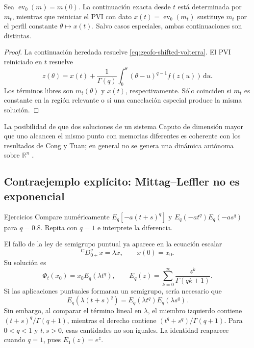 \begin{proposition}
Sea \(\operatorname{ev}_0(m)=m(0)\). La continuación exacta desde \(t\) está
determinada por \(m_t\), mientras que reiniciar el PVI con dato
\(x(t)=\operatorname{ev}_0(m_t)\) sustituye \(m_t\) por el perfil constante
\(\theta\mapsto x(t)\). Salvo casos especiales, ambas continuaciones son
distintas.
\end{proposition}

\begin{proof}
La continuación heredada resuelve \cref{eq:geofo-shifted-volterra}. El PVI
reiniciado en \(t\) resuelve
\begin{equation}
 z(\theta)=x(t)+\frac1{\Gamma(q)}
 \int_0^\theta(\theta-u)^{q-1}f(z(u))\,\mathrm du.
 \label{eq:geofo-reset-volterra}
\end{equation}
Los términos libres son \(m_t(\theta)\) y \(x(t)\), respectivamente. Sólo
coinciden si \(m_t\) es constante en la región relevante o si una cancelación
especial produce la misma solución.
\end{proof}

La posibilidad de que dos soluciones de un sistema Caputo de dimensión mayor
que uno alcancen el mismo punto con memorias diferentes es coherente con los
resultados de Cong y Tuan; en general no se genera una dinámica autónoma sobre
\(\mathbb R^n\) \cite{CongTuan2017Nonlocal}.



\subsection{Contraejemplo explícito: Mittag--Leffler no es exponencial}

\ifHAFOPedagogy
\begin{bloqueestudio}{Ejercicios}
Compare numéricamente
\(E_q[-a(t+s)^q]\) y \(E_q(-at^q)E_q(-as^q)\) para \(q=0.8\).
Repita con \(q=1\) e interprete la diferencia.
\end{bloqueestudio}
\fi

El fallo de la ley de semigrupo puntual ya aparece en la ecuación escalar
\begin{equation}
 {}^{\mathrm C}D_{0+}^{q}x=\lambda x,\qquad x(0)=x_0.
 \label{eq:geofo-scalar-linear}
\end{equation}
Su solución es
\begin{equation}
 \Phi_t(x_0)=x_0E_q(\lambda t^q),
 \qquad
 E_q(z)=\sum_{k=0}^{\infty}\frac{z^k}{\Gamma(qk+1)}.
 \label{eq:geofo-mittag-solution}
\end{equation}
Si las aplicaciones puntuales formaran un semigrupo, sería necesario que
\begin{equation}
 E_q(\lambda(t+s)^q)
 =E_q(\lambda t^q)E_q(\lambda s^q).
 \label{eq:geofo-false-ml-product}
\end{equation}
Sin embargo, al comparar el término lineal en \(\lambda\), el miembro izquierdo
contiene
\((t+s)^q/\Gamma(q+1)\), mientras el derecho contiene
\((t^q+s^q)/\Gamma(q+1)\). Para \(0<q<1\) y \(t,s>0\), esas cantidades no son
iguales. La identidad reaparece cuando \(q=1\), pues \(E_1(z)=e^z\).

